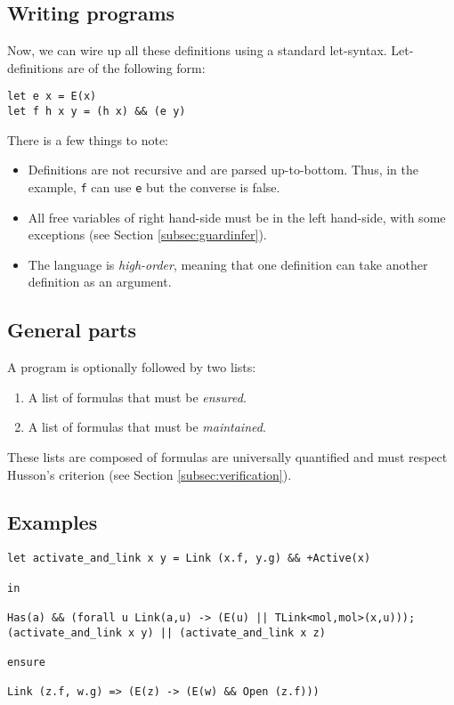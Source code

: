 \documentclass[10pt,a4paper]{article}
\newcommand{\ocaml}{\texttt}
\begin{document}
\subsection{Writing programs}
Now, we can wire up all these definitions using a standard let-syntax. Let-definitions are of the following form:
\begin{verbatim}
let e x = E(x)
let f h x y = (h x) && (e y)
\end{verbatim}
There is a few things to note:
\begin{itemize}
\item Definitions are not recursive and are parsed up-to-bottom. Thus, in the example, \ocaml{f} can use \ocaml{e} but the converse is false.
\item All free variables of right hand-side must be in the left hand-side, with some exceptions (see Section \ref{subsec:guardinfer}).
\item The language is \emph{high-order}, meaning that one definition can take another definition as an argument.
\end{itemize}

\subsection{General parts}
A program is optionally followed by two lists:
\begin{enumerate}
\item A list of formulas that must be \emph{ensured}.
\item A list of formulas that must be \emph{maintained}.
\end{enumerate}

These lists are composed of formulas are universally quantified and must respect Husson's criterion (see Section \ref{subsec:verification}).

\subsection{Examples}
\label{configex}
\begin{verbatim}
let activate_and_link x y = Link (x.f, y.g) && +Active(x)

in

Has(a) && (forall u Link(a,u) -> (E(u) || TLink<mol,mol>(x,u)));
(activate_and_link x y) || (activate_and_link x z)

ensure

Link (z.f, w.g) => (E(z) -> (E(w) && Open (z.f)))
\end{verbatim}
\end{document}
